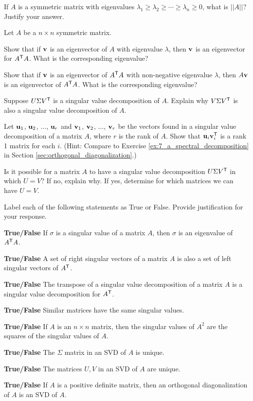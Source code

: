 		\ea

\item If $A$ is a symmetric matrix with eigenvalues $\lambda_1 \geq \lambda_2 \geq \cdots \geq \lambda_n \geq 0$, what is $||A||$? Justify your answer.


\item \label{ex:7_c_Symmetric_SVD}  Let $A$ be a $n \times n$ symmetric matrix. 
	\ba
		\item Show that if $\mathbf{v}$ is an eigenvector of $A$ with eigenvalue $\lambda$, then $\mathbf{v}$ is an eigenvector for $A^{\mathsf{T}}A$. What is the corresponding eigenvalue?  


	\item Show that if $\mathbf{v}$ is an eigenvector of $A^{\mathsf{T}}A$ with non-negative eigenvalue $\lambda$, then $A\mathbf{v}$ is an eigenvector of $A^{\mathsf{T}}A$. What is the corresponding eigenvalue?
 
	\item Suppose $U \Sigma V^{\mathsf{T}}$ is a singular value decomposition of $A$. Explain why $V \Sigma V^{\mathsf{T}}$ is also a singular value decomposition of $A$.
		
	\ea
		


\item \label{ex:7_c_rank1} Let $\mathbf{u}_1$, $\mathbf{u}_2$, $\ldots$, $\mathbf{u}_r$ and $\mathbf{v}_1$, $\mathbf{v}_2$, $\ldots$, $\mathbf{v}_r$ be the vectors found in a singular value decomposition of a matrix $A$, where $r$ is the rank of $A$. Show that $\mathbf{u}_i\mathbf{v}_i^{\mathsf{T}}$ is a rank 1 matrix for each $i$. (Hint: Compare to Exercise \ref{ex:7_a_spectral_decomposition} in Section \ref{sec:orthogonal_diagonalization}.)


\item Is it possible for a matrix $A$ to have a singular value decomposition $U \Sigma V^{\mathsf{T}}$ in which $U = V$? If no, explain why. If yes, determine for which matrices we can have $U = V$.


\item Label each of the following statements as True or False. Provide justification for your response.
	\ba
	\item \textbf{True/False} If $\sigma$ is a singular value of a matrix $A$, then $\sigma$ is an eigenvalue of $A^{\mathsf{T}}A$.
	\item \textbf{True/False} A set of right singular vectors of a matrix $A$ is also a set of left singular vectors of $A^{\mathsf{T}}$. 
	\item \textbf{True/False} The transpose of a singular value decomposition of a matrix $A$ is a singular value decomposition for $A^{\mathsf{T}}$.  
	\item \textbf{True/False} Similar matrices have the same singular values. 
	\item \textbf{True/False} If $A$ is an $n \times n$ matrix, then the singular values of $A^2$ are the squares of the singular values of $A$. 
\item \textbf{True/False} The $\Sigma$ matrix in an SVD of $A$ is unique.
\item \textbf{True/False} The matrices $U, V$ in an SVD of $A$ are unique.
\item \textbf{True/False} If $A$ is a positive definite matrix, then an orthogonal diagonalization of $A$ is an SVD of $A$.
	\ea


